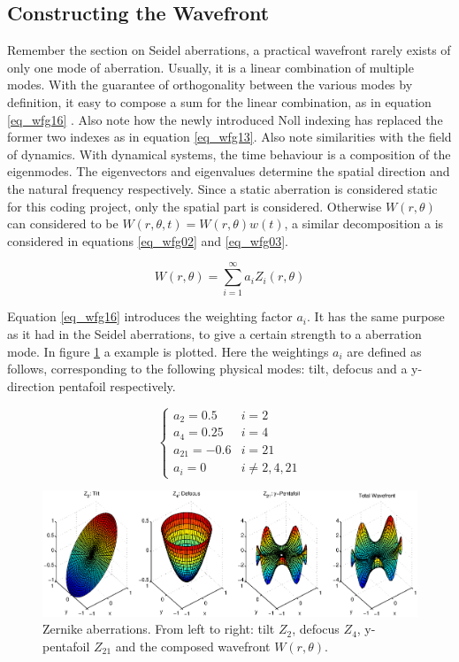 \documentclass{article}
\begin{document}

\newpage
\subsection{Constructing the Wavefront}
Remember the section on Seidel aberrations, a practical wavefront rarely exists of only one mode of aberration. Usually, it is a linear combination of multiple modes. With the guarantee of orthogonality between the various modes by definition, it easy to compose a sum for the linear combination, as in equation \ref{eq_wfg16} \cite{zernikeMatlabPag}. Also note how the newly introduced Noll indexing has replaced the former two indexes as in equation \ref{eq_wfg13}. Also note similarities with the field of dynamics. With dynamical systems, the time behaviour is a composition of the eigenmodes. The eigenvectors and eigenvalues determine the spatial direction and the natural frequency respectively. Since a static aberration is considered static for this coding project, only the spatial part is considered. Otherwise $W(r,\theta)$ can considered to be $W(r,\theta,t) = W(r,\theta)w(t)$, a similar decomposition a is considered in equations \ref{eq_wfg02} and \ref{eq_wfg03}.

\begin{equation}
W(r,\theta) = \sum \limits_{i=1}^{\infty} a_i Z_i(r,\theta)
\label{eq_wfg16}
\end{equation}

Equation \ref{eq_wfg16} introduces the weighting factor $a_i$. It has the same purpose as it had in the Seidel aberrations, to give a certain strength to a aberration mode. In figure \ref{fig_wfg02} a example is plotted. Here the weightings $a_i$ are defined as follows, corresponding to the following physical modes: tilt, defocus and a y-direction pentafoil respectively.

\begin{equation}
\begin{cases}
a_2 = 0.5 & i = 2 \\
a_4 = 0.25 & i = 4 \\
a_{21} = -0.6 & i = 21 \\
a_i = 0 & i \neq 2,4,21
\end{cases}
\label{eq_wfg17}
\end{equation}

\begin{figure}[H]
	\center
	\includegraphics[width=1.0\textwidth, height=.3\textwidth]{Figures/Zernike.eps}
	\caption{Zernike aberrations. From left to right: tilt $Z_2$, defocus $Z_4$, y-pentafoil $Z_{21}$ and the composed wavefront $W(r,\theta)$.}
	\label{fig_wfg02}
\end{figure}
\end{document}

